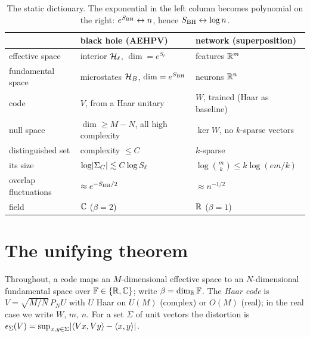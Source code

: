 \begin{table}[h]
\centering\small
\begin{tabular}{@{}lll@{}}
\toprule
 & black hole (AEHPV) & network (superposition) \\
\midrule
effective space & interior $\mathcal H_\ell$, $\dim=e^{S_\ell}$ & features $\mathbb R^m$ \\
fundamental space & microstates $\mathcal H_B$, $\dim=e^{S_{\rm BH}}$ & neurons $\mathbb R^n$ \\
code & $V$, from a Haar unitary & $W$, trained (Haar as baseline) \\
null space & $\dim\ge M-N$, all high complexity & $\ker W$, no $k$-sparse vectors \\
distinguished set & complexity $\le C$ & $k$-sparse \\
its size & $\log\lvert \Sigma_C\rvert\lesssim C\log S_\ell$ & $\log\binom mk\le k\log(em/k)$ \\
overlap fluctuations & $\approx e^{-S_{\rm BH}/2}$ & $\approx n^{-1/2}$ \\
field & $\mathbb C$ ($\beta=2$) & $\mathbb R$ ($\beta=1$) \\
\bottomrule
\end{tabular}
\caption{The static dictionary. The exponential in the left column becomes polynomial on the right:
$e^{S_{\rm BH}}\leftrightarrow n$, hence $S_{\rm BH}\leftrightarrow\log n$.}
\label{tab:static}
\end{table}

\section{The unifying theorem}\label{sec:theorem}

Throughout, a code maps an $M$-dimensional effective space to an $N$-dimensional fundamental space over
$\mathbb F\in\{\mathbb R,\mathbb C\}$; write $\beta=\dim_\mathbb R\mathbb F$. The \emph{Haar code} is $V=\sqrt{M/N}\,P_NU$ with $U$ Haar on $U(M)$
(complex) or $O(M)$ (real); in the real case we write $W$, $m$, $n$. For a set $\Sigma$ of unit vectors the
distortion is $\epsilon_\Sigma(V)=\sup_{x,y\in\Sigma}\lvert \langle Vx,Vy\rangle-\langle x,y\rangle\rvert$.


